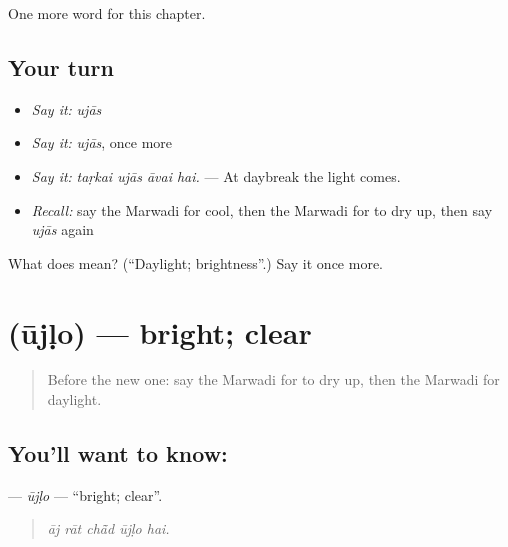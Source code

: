 \begin{grammarlens}[title={What you've built}]
One more word for this chapter.
\end{grammarlens}

\subsection*{Your turn}
\begin{itemize}
\raggedright
  \item \emph{Say it:} \emph{ujās}
  \item \emph{Say it:} \emph{ujās}, once more
  \item \emph{Say it:} \emph{taṛkai ujās āvai hai.} — At daybreak the light comes.
  \item \emph{Recall:} say the Marwadi for cool, then the Marwadi for to dry up, then say \emph{ujās} again
\end{itemize}

\begin{tcolorbox}[breakable,colback=teal!4,colframe=teal!35!black,title={Before you move on}]
What does  mean? (\textquotedblleft{}Daylight; brightness\textquotedblright{}.) Say it once more.
\end{tcolorbox}
\section[\texorpdfstring{\mw{ऊजळो} (ūjḷo)}{ऊजळो (ūjḷo)}]{ (ūjḷo) — bright; clear}

\label{lesson:MW-C229-ujlo}



\begin{quote}
Before the new one: say the Marwadi for to dry up, then the Marwadi for daylight.
\end{quote}

\subsection*{You'll want to know: }
\textbf{} — \emph{ūjḷo} — \textquotedblleft{}bright; clear\textquotedblright{}.

\begin{quote}
    
\end{quote}

\begin{quote}
\emph{āj rāt chā̃d ūjḷo hai.}
\end{quote}

